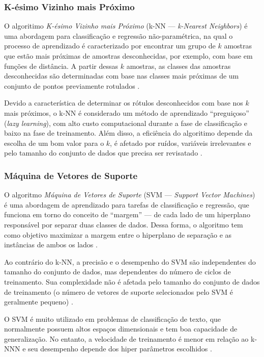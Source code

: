 \documentclass[
	12pt,				%
	oneside,			%
	a4paper,			%
	english,			%
	brazil				%
	]{abntex2ppgsi}
\begin{document}
\subsubsection{K-ésimo Vizinho mais Próximo} 

O algoritimo \textit{K-ésimo Vizinho mais Próximo} (k-NN ---  \textit{k-Nearest Neighbors}) é uma abordagem para classificação e regressão não-paramétrica, na  qual o processo de aprendizado é caracterizado por encontrar um grupo de $k$ amostras que estão mais próximas de amostras desconhecidas, por exemplo, com base em funções de distância. A partir dessas $k$ amostras, as classes das amostras desconhecidas são determinadas com base nas classes mais próximas de um conjunto de pontos previamente rotulados \cite{singh2016review, thanh2018comparison}. 

Devido a característica de determinar os rótulos desconhecidos com base nos $k$ mais próximos, o k-NN é considerado um método de aprendizado ``preguiçoso'' (\textit{lazy learning}), com alto custo computacional durante a fase de classificação  e baixo na fase de treinamento. Além disso, a eficiência do algoritimo depende da escolha de um bom valor para o $k$, é afetado por ruídos, variáveis irrelevantes e pelo tamanho do conjunto de dados que precisa ser revisatado \cite{singh2016review, kibanov2018adaptive}. 

\subsubsection{Máquina de Vetores de Suporte}

O algoritmo \textit{Máquina de Vetores de Suporte} (SVM --- \textit{Support Vector Machines}) é uma abordagem de aprendizado para tarefas de classificação e regressão, que funciona em torno do conceito de ``margem'' --- de cada lado de um hiperplano responsável por separar duas classes de dados. Dessa forma, o algoritmo tem como objetivo maximizar a margem entre o hiperplano de separação e as instâncias de ambos os lados \cite{kotsiantis2006machine, singh2016review}. 

Ao contrário do k-NN, a precisão e o desempenho do SVM são independentes do tamanho do conjunto de dados, mas dependentes do número de ciclos de treinamento. Sua complexidade não é afetada pelo tamanho do conjunto de dados de treinamento (o número de vetores de suporte selecionados pelo SVM é geralmente pequeno) \cite{kotsiantis2006machine, singh2016review}.

O SVM é muito utilizado em problemas de classificação de texto, que normalmente possuem altos espaços dimensionais e tem boa capacidade de generalização. No entanto, a velocidade de treinamento é menor em relação ao k-NNN e seu desempenho depende dos hiper parâmetros escolhidos \cite{kotsiantis2006machine, singh2016review}.
\end{document}
